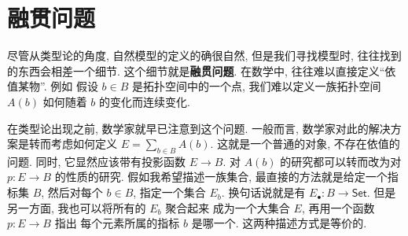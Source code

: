 


\section[融贯问题]{融贯问题\protect{}}

尽管从类型论的角度, 自然模型的定义的确很自然,
但是我们寻找模型时, 往往找到的东西会相差一个细节.
这个细节就是\textbf{融贯问题}.
在数学中, 往往难以直接定义“依值某物”. 例如
假设 \(b \in B\) 是拓扑空间中的一个点,
我们难以定义一族拓扑空间 \(A(b)\) 如何随着 \(b\)
的变化而连续变化.

在类型论出现之前, 数学家就早已注意到这个问题.
一般而言, 数学家对此的解决方案是转而考虑如何定义
\(E = \sum_{b \in B} A(b)\).
这就是一个普通的对象, 不存在依值的问题.
同时, 它显然应该带有投影函数 \(E \to B\).
对 \(A(b)\) 的研究都可以转而改为对 \(p : E \to B\) 的性质的研究.
假如我希望描述一族集合, 最直接的方法就是给定一个指标集 \(B\),
然后对每个 \(b \in B\), 指定一个集合 \(E_b\).
换句话说就是有 \(E_\bullet : B \to \mathsf{Set}\).
但是另一方面, 我也可以将所有的 \(E_b\) 聚合起来
成为一个大集合 \(E\), 再用一个函数 \(p : E \to B\) 指出
每个元素所属的指标 \(b\) 是哪一个. 这两种描述方式是等价的.

\begin{center}
\end{center}

